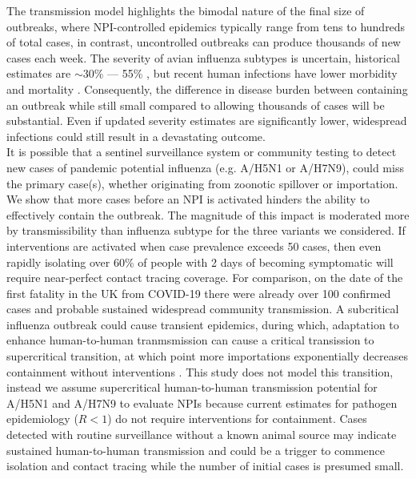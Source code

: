\documentclass{article}
\begin{document}
The transmission model highlights the bimodal nature of the final size of outbreaks, where NPI-controlled epidemics typically range from tens to hundreds of total cases, in contrast, uncontrolled outbreaks can produce thousands of new cases each week. The severity of avian influenza subtypes is uncertain, historical estimates are $\sim$30\% --- 55\% \citep{tannerPandemicPotentialAvian2015}, but recent human infections have lower morbidity and mortality \citep{gargHighlyPathogenicAvian2025, krammerHighlyPathogenicAvian2025}. Consequently, the difference in disease burden between containing an outbreak while still small compared to allowing thousands of cases will be substantial. Even if updated severity estimates are significantly lower, widespread infections could still result in a devastating outcome. \\

It is possible that a sentinel surveillance system or community testing to detect new cases of pandemic potential influenza (e.g. A/H5N1 or A/H7N9), could miss the primary case(s), whether originating from zoonotic spillover or importation. We show that more cases before an NPI is activated hinders the ability to effectively contain the outbreak. The magnitude of this impact is moderated more by transmissibility than influenza subtype for the three variants we considered. If interventions are activated when case prevalence exceeds 50 cases, then even rapidly isolating over 60\% of people with 2 days of becoming symptomatic will require near-perfect contact tracing coverage. For comparison, on the date of the first fatality in the UK from COVID-19 there were already over 100 confirmed cases and probable sustained widespread community transmission. A subcritical influenza outbreak could cause transient epidemics, during which, adaptation to enhance human-to-human tranmsmission can cause a critical transission to supercritical transition, at which point more importations exponentially decreases containment without interventions \citep{whittleOutcomeStochasticEpidemicA1955, farringtonDistributionTimeExtinction1999, antiaRoleEvolutionEmergence2003, lloyd-smithSuperspreadingEffectIndividual2005}. This study does not model this transition, instead we assume supercritical human-to-human transmission potential for A/H5N1 and A/H7N9 to evaluate NPIs because current estimates for pathogen epidemiology ($R < 1$) do not require interventions for containment. Cases detected with routine surveillance without a known animal source may indicate sustained human-to-human transmission and could be a trigger to commence isolation and contact tracing while the number of initial cases is presumed small. \\
\end{document}
